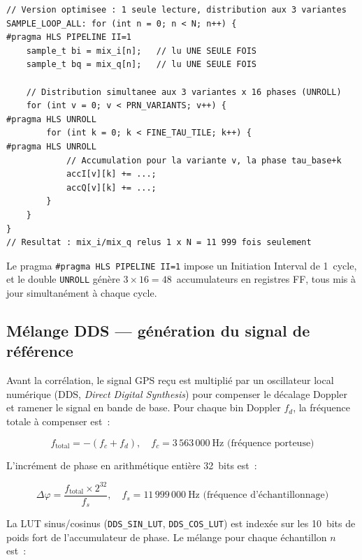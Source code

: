 \documentclass[11pt,a4paper]{article}
\begin{document}
\begin{lstlisting}[caption={Version optimisée --- lecture $\times1$ avec distribution parallèle}]
// Version optimisee : 1 seule lecture, distribution aux 3 variantes
SAMPLE_LOOP_ALL: for (int n = 0; n < N; n++) {
#pragma HLS PIPELINE II=1
    sample_t bi = mix_i[n];   // lu UNE SEULE FOIS
    sample_t bq = mix_q[n];   // lu UNE SEULE FOIS

    // Distribution simultanee aux 3 variantes x 16 phases (UNROLL)
    for (int v = 0; v < PRN_VARIANTS; v++) {
#pragma HLS UNROLL
        for (int k = 0; k < FINE_TAU_TILE; k++) {
#pragma HLS UNROLL
            // Accumulation pour la variante v, la phase tau_base+k
            accI[v][k] += ...;
            accQ[v][k] += ...;
        }
    }
}
// Resultat : mix_i/mix_q relus 1 x N = 11 999 fois seulement
\end{lstlisting}

Le pragma \texttt{\#pragma HLS PIPELINE II=1} impose un Initiation Interval de 1~cycle, et le double \texttt{UNROLL} génère $3 \times 16 = 48$~accumulateurs en registres FF, tous mis à jour simultanément à chaque cycle.

\subsection{Mélange DDS --- génération du signal de référence}

Avant la corrélation, le signal GPS reçu est multiplié par un oscillateur local numérique (DDS, \textit{Direct Digital Synthesis}) pour compenser le décalage Doppler et ramener le signal en bande de base. Pour chaque bin Doppler $f_d$, la fréquence totale à compenser est~:

\begin{equation}
f_{\text{total}} = -(f_c + f_d), \quad f_c = 3\,563\,000~\text{Hz (fréquence porteuse)}
\end{equation}

L'incrément de phase en arithmétique entière 32~bits est~:

\begin{equation}
\Delta\varphi = \frac{f_{\text{total}} \times 2^{32}}{f_s}, \quad f_s = 11\,999\,000~\text{Hz (fréquence d'échantillonnage)}
\end{equation}

La LUT sinus/cosinus (\texttt{DDS\_SIN\_LUT}, \texttt{DDS\_COS\_LUT}) est indexée sur les 10~bits de poids fort de l'accumulateur de phase. Le mélange pour chaque échantillon $n$ est~:
\end{document}
